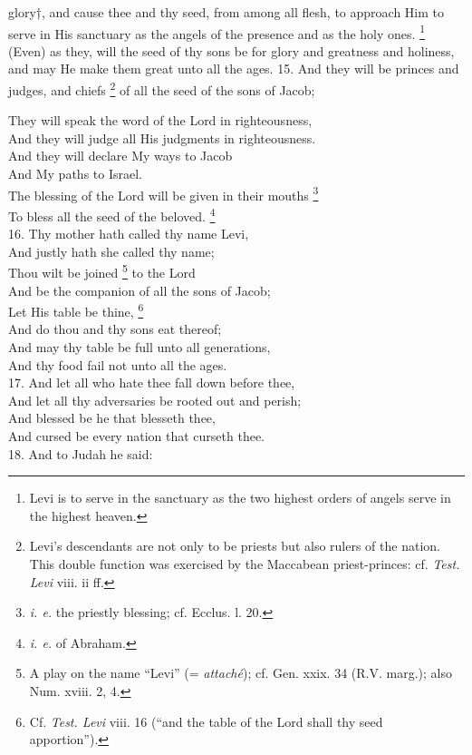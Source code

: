glory†, and cause thee and thy seed, from among all flesh, to approach Him to serve in His sanctuary as the angels of the presence and as the holy ones. \footnote{Levi is to serve in the sanctuary as the two highest orders of angels serve in the highest heaven.} (Even) as they, will the seed of thy sons be for glory and greatness and holiness, and may He make them great unto all the ages. 15. And they will be princes and judges, and chiefs \footnote{Levi's descendants are not only to be priests but also rulers of the nation. This double function was exercised by the Maccabean priest-princes: cf. \emph{Test. Levi} viii. ii ff.} of all the seed of the sons of Jacob;

They will speak the word of the Lord in righteousness,\\
And they will judge all His judgments in righteousness.\\
And they will declare My ways to Jacob\\
And My paths to Israel.\\
The blessing of the Lord will be given in their mouths \footnote{\emph{i. e.} the priestly blessing; cf. Ecclus. l. 20.}\\
To bless all the seed of the beloved. \footnote{\emph{i. e.} of Abraham.}\\
16. Thy mother hath called thy name Levi,\\
And justly hath she called thy name;\\
Thou wilt be joined \footnote{A play on the name ``Levi'' (= \emph{attaché}); cf. Gen. xxix. 34 (R.V. marg.); also Num. xviii. 2, 4.} to the Lord\\
And be the companion of all the sons of Jacob;\\
Let His table be thine, \footnote{Cf. \emph{Test. Levi} viii. 16 (``and the table of the Lord shall thy seed apportion'').}\\
And do thou and thy sons eat thereof;\\
And may thy table be full unto all generations,\\
And thy food fail not unto all the ages.\\
17. And let all who hate thee fall down before thee,\\
And let all thy adversaries be rooted out and perish;\\
And blessed be he that blesseth thee,\\
And cursed be every nation that curseth thee. \\
18. And to Judah he said:\\
